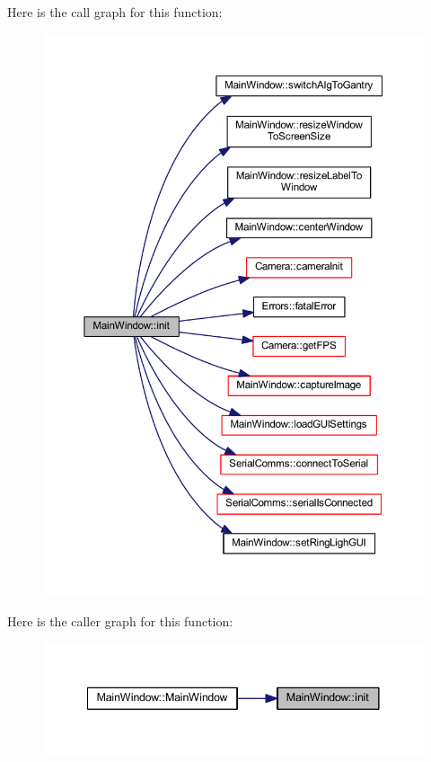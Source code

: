 Here is the call graph for this function\+:
\nopagebreak
\begin{figure}[H]
\begin{center}
\leavevmode
\includegraphics[width=350pt]{class_main_window_a671e7e5b0a3a7a3fb1cf44c5c8377952_cgraph}
\end{center}
\end{figure}
Here is the caller graph for this function\+:
\nopagebreak
\begin{figure}[H]
\begin{center}
\leavevmode
\includegraphics[width=341pt]{class_main_window_a671e7e5b0a3a7a3fb1cf44c5c8377952_icgraph}
\end{center}
\end{figure}
\mbox{\label{class_main_window_a1bc0cb9910e8898744ff85e8326bf73d}} 
